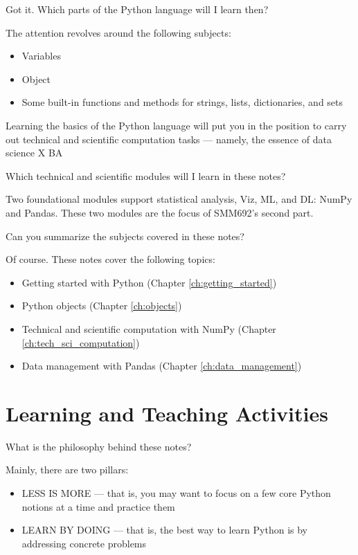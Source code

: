 \documentclass[a4paper,11pt]{book}
\newcommand{\question}[1]{%
    \begin{tcolorbox}[colback=comp_c!10,colframe=comp_c,sidebyside align=top,width=\linewidth,before skip=1ex]
        #1
    \end{tcolorbox}
    \switchcolumn%
}
\newcommand{\note}[1]{%
    \begin{tcolorbox}[colback=white!0,colframe=white!10,width=\linewidth,before skip=1ex]
        #1
    \end{tcolorbox}
}
\begin{document}
\begin{paracol}{2}
	\question{\raggedright Got it. Which parts of the Python language will I learn then?}
	\note{

	The attention revolves around the following subjects:

		\begin{itemize}
			\item Variables
			\item Object
			\item Some built-in functions and methods for strings, lists, dictionaries, and sets
		\end{itemize}
	
	\quad Learning the basics of the Python language will put you in the position to carry out technical and scientific computation tasks --- namely, the essence of data science X BA
	}
\end{paracol}

\begin{paracol}{2}
	\question{\raggedright Which technical and scientific modules will I learn in these notes?}
	\note{Two foundational modules support statistical analysis, Viz, ML, and DL: NumPy and Pandas. These two modules are the focus of SMM692's second part.
	}
\end{paracol}

\begin{paracol}{2}
	\question{\raggedright Can you summarize the subjects covered in these notes?}
	\note{Of course. These notes cover the following topics:
	
	\begin{itemize}
		\item Getting started with Python (Chapter \ref{ch:getting_started})
		\item Python objects (Chapter \ref{ch:objects})
		\item Technical and scientific computation with NumPy (Chapter \ref{ch:tech_sci_computation})
		\item Data management with Pandas (Chapter \ref{ch:data_management})
	\end{itemize}
	}
\end{paracol}

\section{Learning and Teaching Activities}

\begin{paracol}{2}
	\question{\raggedright What is the philosophy behind these notes?}
	\note{Mainly, there are two pillars:
	
	\begin{itemize}
		\item LESS IS MORE --- that is, you may want to focus on a few core Python notions at a time and practice them
		\item LEARN BY DOING --- that is, the best way to learn Python is by addressing concrete problems
	\end{itemize}
	
	}
\end{paracol}
\clearpage
\end{document}
